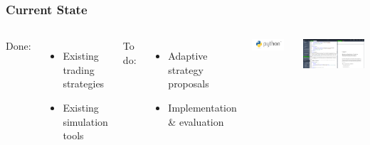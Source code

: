 
\begin{frame}
  \frametitle{Current State}
  \begin{columns}
    Done:
    \begin{itemize}
      \item Existing trading strategies
      \item Existing simulation tools
    \end{itemize}
    \bigskip
    To do:
    \begin{itemize}
      \item Adaptive strategy proposals
      \item Implementation \& evaluation
    \end{itemize}

    \centering
    \includegraphics[width=0.9\textwidth]{img/python.png}

    \bigskip
    \includegraphics[width=\textwidth]{img/overleaf.png}

  \end{columns}
\end{frame}


